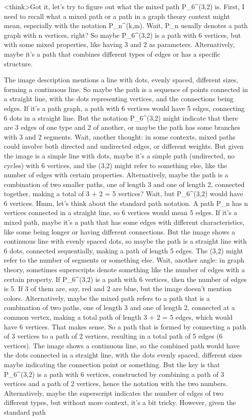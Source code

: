 <think>Got it, let's try to figure out what the mixed path P_6^(3,2) is. First, I need to recall what a mixed path or a path in a graph theory context might mean, especially with the notation P_n^(k,m). Wait, P_n usually denotes a path graph with n vertices, right? So maybe P_6^(3,2) is a path with 6 vertices, but with some mixed properties, like having 3 and 2 as parameters. Alternatively, maybe it's a path that combines different types of edges or has a specific structure. 

The image description mentions a line with dots, evenly spaced, different sizes, forming a continuous line. So maybe the path is a sequence of points connected in a straight line, with the dots representing vertices, and the connections being edges. If it's a path graph, a path with 6 vertices would have 5 edges, connecting 6 dots in a straight line. But the notation P_6^(3,2) might indicate that there are 3 edges of one type and 2 of another, or maybe the path has some branches with 3 and 2 segments. Wait, another thought: in some contexts, mixed paths could involve both directed and undirected edges, or different weights. But given the image is a simple line with dots, maybe it's a simple path (undirected, no cycles) with 6 vertices, and the (3,2) might refer to something else, like the number of edges with certain properties. Alternatively, maybe the path is a combination of two smaller paths, one of length 3 and one of length 2, connected together, making a total of 3 + 2 = 5 vertices? Wait, but P_6^(3,2) would have 6 vertices. Hmm, let's think about the standard path notation. A path P_n has n vertices connected in a straight line, so 6 vertices would mean 5 edges. If it's a mixed path, maybe it's a path that has some edges with different characteristics, like some being longer or having different connections. But the image shows a continuous line with evenly spaced dots, so maybe the path is a straight line with 6 dots, connected sequentially, making a path of length 5 edges. The (3,2) might refer to the number of segments or something else. Wait, another angle: in graph theory, sometimes superscripts denote something like the number of edges with a certain property. If P_6^(3,2) is a path with 6 vertices, then the number of edges is 5. If 3 of them are, say, red and 2 are blue, but the image doesn't mention colors. Alternatively, maybe the mixed path refers to a path that is a combination of two paths, one of length 3 and one of length 2, connected at a common vertex, making a total path of length 3 + 2 = 5 edges, which would have 6 vertices. That makes sense. So a path that is formed by connecting a path of 3 vertices to a path of 2 vertices, resulting in a total path of 5 edges (6 vertices). The image shows a continuous line, so the combined path would have the dots connected in a straight line, with the dots evenly spaced, different sizes maybe indicating the connection point or something. But the key is that P_6^(3,2) is a path with 6 vertices, constructed by combining a path of 3 vertices and a path of 2 vertices, hence the notation with the two numbers. Alternatively, maybe the superscript indicates the number of edges of two different types, but without more context, it's a bit tricky. However, given the standard path 